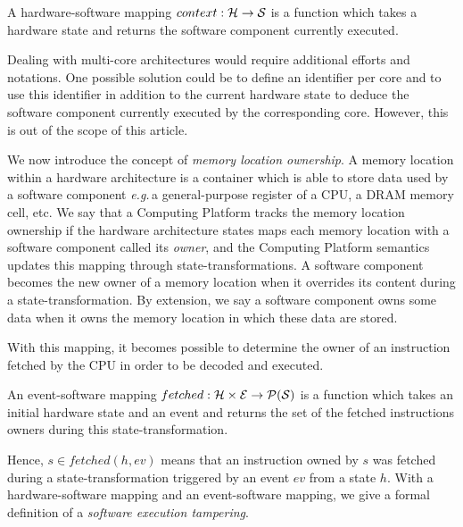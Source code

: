 \begin{definition}
  \label{def:hardsoftmap}
  A hardware-software mapping $con\-text : \mathcal{H} \rightarrow \mathcal{S}$ is a
  function which takes a hardware state and returns the software component
  currently executed.
\end{definition}

Dealing with multi-core architectures would require additional efforts and
notations. One possible solution could be to define an identifier per core and
to use this identifier in addition to the current hardware state to deduce the
software component currently executed by the corresponding core. However, this
is out of the scope of this article.

We now introduce the concept of \textit{memory location ownership}. A memory
location within a hardware architecture is a container which is able to store
data used by a software component \emph{e.g.}\,a general-purpose register of a
CPU, a DRAM memory cell, etc. We say that a Computing Platform tracks the memory
location ownership if the hardware architecture states maps each memory location
with a software component called its \emph{owner}, and the Computing Platform
semantics updates this mapping through state-transformations. A software
component becomes the new owner of a memory location when it overrides its
content during a state-transformation. By extension, we say a software component
owns some data when it owns the memory location in which these data are stored.

With this mapping, it becomes possible to determine the owner of an instruction
fetched by the CPU in order to be decoded and executed.

\begin{definition}
  \label{def:evsoft}
  An event-software mapping $fet\-ched: \mathcal{H} \times \mathcal{E} \rightarrow
  \mathcal{P}(\mathcal{S})$ is a function which takes an initial hardware state and
  an event and returns the set of the fetched instructions owners during this
  state-transformation.
\end{definition}

Hence, $s \in fetched(h, ev)$ means that an instruction owned by $s$ was fetched
during a state-transformation triggered by an event $ev$ from a state $h$. With
a hardware-software mapping and an event-software mapping, we give a formal
definition of a \textit{software execution tampering}.

